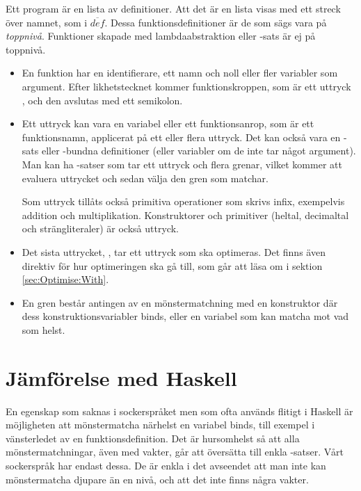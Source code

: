 \documentclass[Rapport]{subfiles}
\begin{document}
Ett program är en lista av definitioner. Att det är en lista visas med ett
streck över namnet, som i $\overline{def}$.
Dessa funktionsdefinitioner är de som sägs vara på \emph{toppnivå}. Funktioner 
skapade med lambdaabstraktion eller -sats är ej på toppnivå. 
\begin{itemize}
\item En funktion har en identifierare, ett namn och noll eller fler variabler som argument. Efter likhetstecknet
kommer funktionskroppen, som är ett uttryck , och den avslutas med
ett semikolon.

\item  Ett uttryck kan vara en variabel eller ett funktionsanrop, som är ett
funktionsnamn, applicerat på ett eller flera uttryck. Det kan också vara en -sats eller
-bundna definitioner (eller variabler om de inte tar något argument).
Man kan ha -satser som tar ett uttryck och flera grenar, vilket kommer
att evaluera uttrycket och sedan välja den gren som matchar.

Som uttryck tillåts också primitiva operationer som skrivs infix, exempelvis addition 
och multiplikation. Konstruktorer och primitiver (heltal, decimaltal och strängliteraler) är också uttryck.


\item  Det sista uttrycket, , tar ett uttryck som ska optimeras. Det finns även direktiv för hur optimeringen ska gå till, som går att läsa om i sektion \ref{sec:Optimise:With}.


\item En gren består antingen av en mönstermatchning med en konstruktor där
      dess konstruktionsvariabler binds, eller en variabel som kan matcha mot vad som helst.
\end{itemize}

\section{Jämförelse med Haskell}

    En egenskap som saknas i sockerspråket men som ofta används flitigt i Haskell är 
möjligheten att mönstermatcha närhelst en variabel binds, till exempel i vänsterledet
av en funktionsdefinition. Det är hursomhelst så att alla mönstermatchningar,
även med vakter, går att översätta till enkla -satser. Vårt sockerspråk
har endast dessa. De är enkla i det avseendet att man inte kan mönstermatcha djupare
än en nivå, och att det inte finns några vakter.
\end{document}
